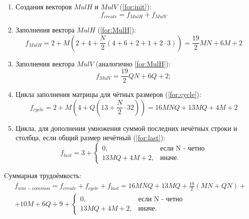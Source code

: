 \begin{enumerate}
	\item Создания векторов $MulH$ и $MulV$ (\ref{for:init}):
	\begin{equation}
	\label{for:init}
	f_{create} = f_{MulH} + f_{MulV}
	\end{equation}
	
	\item Заполнения вектора $MulH$ (\ref{for:MulH}):
	\begin{equation}
	\label{for:MulH}
	f_{MulH}=2+M(2+4+\frac{N}{2}(4+6+2+1+2\cdot3))=\frac{19}{2}MN+6M+2
	\end{equation}
	
	\item Заполнения вектора $MulV$ (аналогично \ref{for:MulH}):
	\begin{equation}
	\label{for:MulV}
	f_{MulV}=\frac{19}{2}QN+6Q+2;
	\end{equation}
	
	\item Цикла заполнения матрицы для чётных размеров (\ref{for:cycle}):
	\begin{equation}
	\label{for:cycle}
	f_{cycle}=2+M(4+Q(13+\frac{N}{2}\cdot32))=16MNQ+13MQ+4M+2
	\end{equation}
	
	\item Цикла, для дополнения умножения суммой последних нечётных строки и столбца, если общий размер нечётный (\ref{for:last}):
	\begin{equation}
	\label{for:last}
	f_{last} = 3 + \begin{cases}
	0, & \text{если N - четно}\\
	13MQ+4M+2, & \text{иначе.}
	\end{cases}
	\end{equation}
\end{enumerate}

Cуммарная трудоёмкость:
\begin{equation}
	\label{for:common}
	\begin{split}
		&f_{win-common}=f_{create}+f_{cycle}+f_{last}=16MNQ+13MQ+\frac{19}{2}(MN+QN)+\\
		&+10M+6Q+9+\begin{cases}0, & \text{если N - четно}\\13MQ+4M+2, & \text{иначе.}\end{cases}
	\end{split}
\end{equation}


